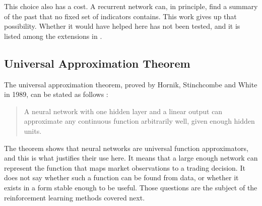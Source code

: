 This choice also has a cost. A recurrent network can, in principle, find a summary of the past that no fixed set of indicators contains. This work gives up that possibility. Whether it would have helped here has not been tested, and it is listed among the extensions in .

\subsection{Universal Approximation Theorem}

The universal approximation theorem, proved by Hornik, Stinchcombe and White in 1989, can be stated as follows \cite{hornik_multilayer_1989}:

\begin{quote}
A neural network with one hidden layer and a linear output can approximate any continuous function arbitrarily well, given enough hidden units.
\end{quote}

The theorem shows that neural networks are universal function approximators, and this is what justifies their use here. It means that a large enough network can represent the function that maps market observations to a trading decision. It does not say whether such a function can be found from data, or whether it exists in a form stable enough to be useful. Those questions are the subject of the reinforcement learning methods covered next.
